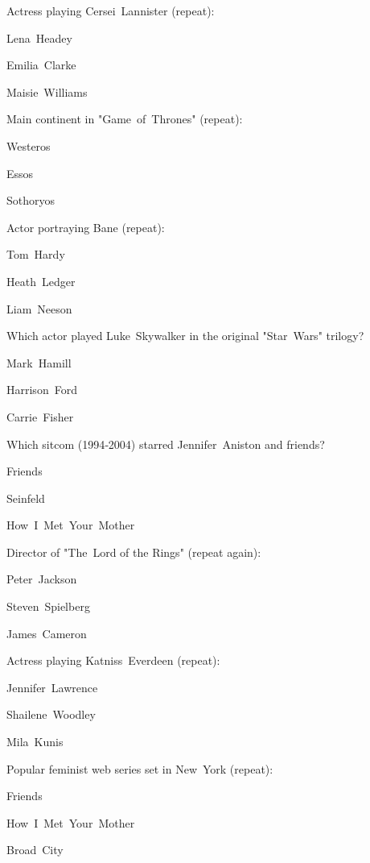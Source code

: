 \begin{enhancedmcq}{Actress playing Cersei Lannister (repeat):}
\item Lena Headey
\item Emilia Clarke
\item Maisie Williams

\end{enhancedmcq}
\begin{enhancedmcq}{Main continent in "Game of Thrones" (repeat):}
\item Westeros
\item Essos
\item Sothoryos

\end{enhancedmcq}
\begin{enhancedmcq}{Actor portraying Bane (repeat):}
\item Tom Hardy
\item Heath Ledger
\item Liam Neeson

\end{enhancedmcq}
\begin{enhancedmcq}{Which actor played Luke Skywalker in the original "Star Wars" trilogy?}
\item Mark Hamill
\item Harrison Ford
\item Carrie Fisher

\end{enhancedmcq}
\begin{enhancedmcq}{Which sitcom (1994‑2004) starred Jennifer Aniston and friends?}
\item Friends
\item Seinfeld
\item How I Met Your Mother

\end{enhancedmcq}
\begin{enhancedmcq}{Director of "The Lord of the Rings" (repeat again):}
\item Peter Jackson
\item Steven Spielberg
\item James Cameron

\end{enhancedmcq}
\begin{enhancedmcq}{Actress playing Katniss Everdeen (repeat):}
\item Jennifer Lawrence
\item Shailene Woodley
\item Mila Kunis

\end{enhancedmcq}
\begin{enhancedmcq}{Popular feminist web series set in New York (repeat):}
\item Friends
\item How I Met Your Mother
\item Broad City
\end{enhancedmcq}